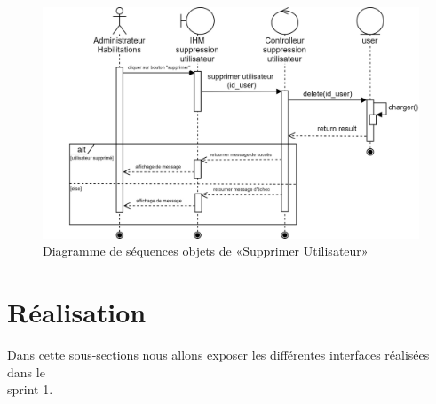 \begin{figure}[H]
	\centering
	\includegraphics[width=0.75\linewidth]{img/conception/sequences/delete-obj}
	\caption[Diagramme de séquences objets de «Supprimer Utilisateur»]{Diagramme de séquences objets de «Supprimer Utilisateur»}
	\label{fig:delete-obj}
\end{figure}

\section[Réalisation]{Réalisation}
Dans cette sous-sections nous allons exposer les différentes interfaces réalisées dans le \\sprint 1. 
